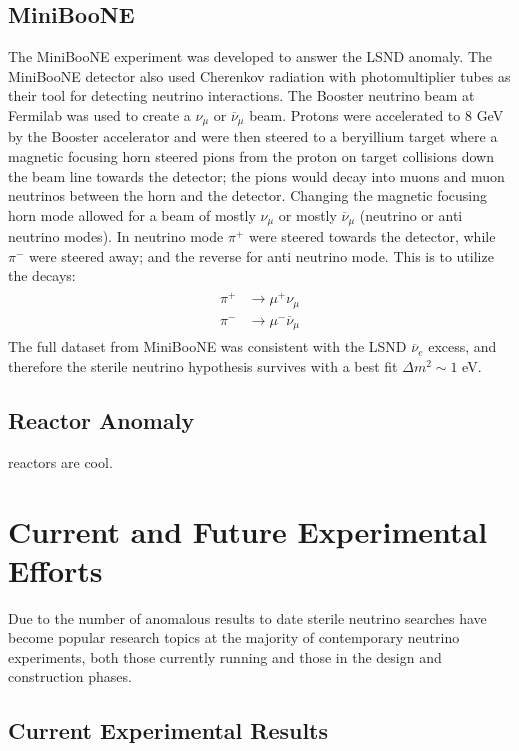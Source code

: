 \documentclass[aps,prd,twocolumn,nofootinbib]{revtex4-1}
\begin{document}
\subsection{MiniBooNE}
The MiniBooNE experiment was developed to answer the LSND anomaly. The MiniBooNE detector also used Cherenkov radiation with photomultiplier tubes as their tool for detecting neutrino interactions. The Booster neutrino beam at Fermilab was used to create a $\nu_\mu$ or $\overline{\nu}_\mu$ beam. Protons were accelerated to 8 GeV by the Booster accelerator and were then steered to a beryillium target where a magnetic focusing horn steered pions from the proton on target collisions down the beam line towards the detector; the pions would decay into muons and muon neutrinos between the horn and the detector. Changing the magnetic focusing horn mode allowed for a beam of mostly $\nu_\mu$ or mostly $\overline{\nu}_\mu$ (neutrino or anti neutrino modes). In neutrino mode $\pi^+$ were steered towards the detector, while $\pi^-$ were steered away; and the reverse for anti neutrino mode. This is to utilize the decays:
\begin{align}
  \begin{split}
    \pi^+ &\rightarrow \mu^+\nu_\mu \\
    \pi^- &\rightarrow \mu^-\overline{\nu}_\mu  
  \end{split}
\end{align}
The full dataset from MiniBooNE was consistent with the LSND $\overline{\nu}_e$ excess, and therefore the sterile neutrino hypothesis survives with a best fit $\Delta m^2 \sim 1$ eV.
\subsection{Reactor Anomaly}
reactors are cool.

\section{Current and Future Experimental Efforts}
Due to the number of anomalous results to date sterile neutrino searches have become popular research topics at the majority of contemporary neutrino experiments, both those currently running and those in the design and construction phases.
\subsection{Current Experimental Results}
\end{document}
